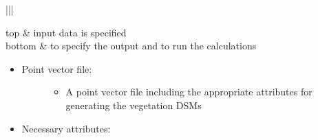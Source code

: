 \documentclass[letterpaper,10pt,english]{sphinxmanual}
\begin{document}
\begin{savenotes}\sphinxattablestart
\centering
\begin{tabular}[t]{|||}
\hline

top
&
input data is specified
\\
\hline
bottom
&
to specify the output and to run the calculations
\\
\hline
\end{tabular}
\par
\sphinxattableend\end{savenotes}
\begin{itemize}
\item {} \begin{description}
\item[{Point vector file:}] \leavevmode\begin{itemize}
\item {} 
A point vector file including the appropriate attributes for generating the vegetation DSMs

\end{itemize}

\end{description}

\item {} 
Necessary attributes:

\end{itemize}
\end{document}
